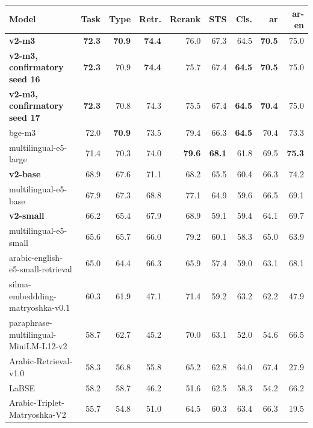 \begin{tabular}{@{}lrrrrrrrr@{}}
\toprule
Model & Task & Type & Retr. & Rerank & STS & Cls. & ar & ar-en \\
\midrule
\textbf{v2-m3} & \textbf{72.3} & \textbf{70.9} & \textbf{74.4} & 76.0 & 67.3 & 64.5 & \textbf{70.5} & 75.0 \\
\textbf{v2-m3, confirmatory seed 16} & \textbf{72.3} & 70.9 & \textbf{74.4} & 75.7 & 67.4 & \textbf{64.5} & \textbf{70.5} & 75.0 \\
\textbf{v2-m3, confirmatory seed 17} & \textbf{72.3} & 70.8 & 74.3 & 75.5 & 67.4 & \textbf{64.5} & \textbf{70.4} & 75.0 \\
bge-m3 & 72.0 & \textbf{70.9} & 73.5 & 79.4 & 66.3 & \textbf{64.5} & 70.4 & 73.3 \\
multilingual-e5-large & 71.4 & 70.3 & 74.0 & \textbf{79.6} & \textbf{68.1} & 61.8 & 69.5 & \textbf{75.3} \\
\textbf{v2-base} & 68.9 & 67.6 & 71.1 & 68.2 & 65.5 & 60.4 & 66.3 & 74.2 \\
multilingual-e5-base & 67.9 & 67.3 & 68.8 & 77.1 & 64.9 & 59.6 & 66.5 & 69.1 \\
\textbf{v2-small} & 66.2 & 65.4 & 67.9 & 68.9 & 59.1 & 59.4 & 64.1 & 69.7 \\
multilingual-e5-small & 65.6 & 65.7 & 66.0 & 79.2 & 60.1 & 58.3 & 65.0 & 63.9 \\
arabic-english-e5-small-retrieval & 65.0 & 64.4 & 66.3 & 65.9 & 57.4 & 59.0 & 63.1 & 68.1 \\
silma-embeddding-matryoshka-v0.1 & 60.3 & 61.9 & 47.1 & 71.4 & 59.2 & 63.2 & 62.2 & 47.9 \\
paraphrase-multilingual-MiniLM-L12-v2 & 58.7 & 62.7 & 45.2 & 70.0 & 63.1 & 52.0 & 54.6 & 66.5 \\
Arabic-Retrieval-v1.0 & 58.3 & 56.8 & 55.8 & 65.2 & 62.8 & 64.0 & 67.4 & 27.9 \\
LaBSE & 58.2 & 58.7 & 46.2 & 51.6 & 62.5 & 58.3 & 54.2 & 66.2 \\
Arabic-Triplet-Matryoshka-V2 & 55.7 & 54.8 & 51.0 & 64.5 & 60.3 & 63.4 & 66.3 & 19.5 \\
\bottomrule
\end{tabular}
